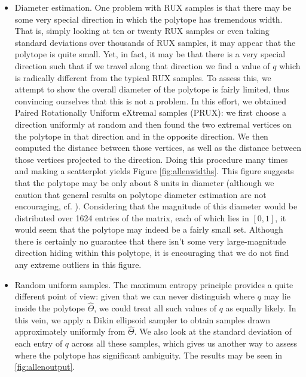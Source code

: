 \begin{itemize}
    \item Diameter estimation.  One problem with RUX samples is that there may be some very special direction in which the polytope has tremendous width.  That is, simply looking at ten or twenty RUX samples or even taking standard deviations over thousands of RUX samples, it may appear that the polytope is quite small.  Yet, in fact, it may be that there is a very special direction such that if we travel along that direction we find a value of $q$ which is radically different from the typical RUX samples.  To assess this, we attempt to show the overall diameter of the polytope is fairly limited, thus convincing ourselves that this is not a problem.  In this effort, we obtained Paired Rotationally Uniform eXtremal samples (PRUX): we first choose a direction uniformly at random and then found the two extremal vertices on the polytope in that direction and in the opposite direction.  We then computed the distance between those vertices, as well as the distance between those vertices projected to the direction.  Doing this procedure many times and making a scatterplot yields Figure \ref{fig:allenwidths}.  This figure suggests that the polytope may be only about 8 units in diameter (although we caution that general results on polytope diameter estimation are not encouraging, cf. \citep{brieden1998approximation}).  Considering that the magnitude of this diameter would be distributed over 1624 entries of the matrix, each of which lies in $[0,1]$, it would seem that the polytope may indeed be a fairly small set.  Although there is certainly no guarantee that there isn't some very large-magnitude direction hiding within this polytope, it is encouraging that we do not find any extreme outliers in this figure.  

    \item Random uniform samples.  The maximum entropy principle provides a quite different point of view: given that we can never distinguish where $q$ may lie inside the polytope $\hat \Theta$, we could treat all such values of $q$ as equally likely.  In this vein, we apply a Dikin ellipsoid sampler to obtain samples drawn approximately uniformly from $\hat \Theta$.  We also look at the standard deviation of each entry of $q$ across all these samples, which gives us another way to assess where the polytope has significant ambiguity.  The results may be seen in \ref{fig:allenoutput}.
\end{itemize}

